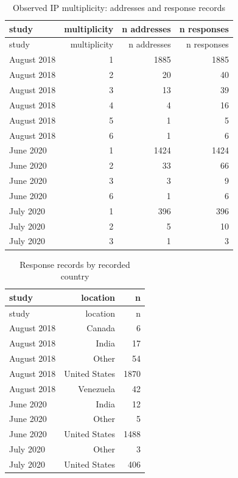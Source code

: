 {\small
\begin{longtable}{lrrr}
\caption{Observed IP multiplicity: addresses and response records}\\
\toprule
study & multiplicity & n addresses & n responses \\
\midrule\endfirsthead
\toprule
study & multiplicity & n addresses & n responses \\
\midrule\endhead
\bottomrule\endfoot
August 2018 & 1 & 1885 & 1885 \\
August 2018 & 2 & 20 & 40 \\
August 2018 & 3 & 13 & 39 \\
August 2018 & 4 & 4 & 16 \\
August 2018 & 5 & 1 & 5 \\
August 2018 & 6 & 1 & 6 \\
June 2020 & 1 & 1424 & 1424 \\
June 2020 & 2 & 33 & 66 \\
June 2020 & 3 & 3 & 9 \\
June 2020 & 6 & 1 & 6 \\
July 2020 & 1 & 396 & 396 \\
July 2020 & 2 & 5 & 10 \\
July 2020 & 3 & 1 & 3 \\
\end{longtable}}
{\small
\begin{longtable}{lrr}
\caption{Response records by recorded country}\\
\toprule
study & location & n \\
\midrule\endfirsthead
\toprule
study & location & n \\
\midrule\endhead
\bottomrule\endfoot
August 2018 & Canada & 6 \\
August 2018 & India & 17 \\
August 2018 & Other & 54 \\
August 2018 & United States & 1870 \\
August 2018 & Venezuela & 42 \\
June 2020 & India & 12 \\
June 2020 & Other & 5 \\
June 2020 & United States & 1488 \\
July 2020 & Other & 3 \\
July 2020 & United States & 406 \\
\end{longtable}}

